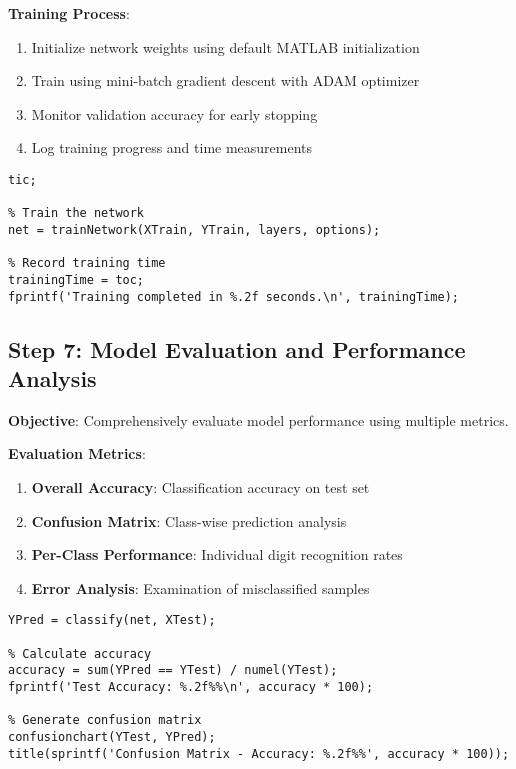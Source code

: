 \documentclass[12pt,a4paper]{article}
\begin{document}
\textbf{Training Process}:
\begin{enumerate}
    \item Initialize network weights using default MATLAB initialization
    \item Train using mini-batch gradient descent with ADAM optimizer
    \item Monitor validation accuracy for early stopping
    \item Log training progress and time measurements
\end{enumerate}

\begin{lstlisting}[caption=Network Training]
% Record training start time
tic;

% Train the network
net = trainNetwork(XTrain, YTrain, layers, options);

% Record training time
trainingTime = toc;
fprintf('Training completed in %.2f seconds.\n', trainingTime);
\end{lstlisting}

\subsection{Step 7: Model Evaluation and Performance Analysis}

\textbf{Objective}: Comprehensively evaluate model performance using multiple metrics.

\textbf{Evaluation Metrics}:
\begin{enumerate}
    \item \textbf{Overall Accuracy}: Classification accuracy on test set
    \item \textbf{Confusion Matrix}: Class-wise prediction analysis
    \item \textbf{Per-Class Performance}: Individual digit recognition rates
    \item \textbf{Error Analysis}: Examination of misclassified samples
\end{enumerate}

\begin{lstlisting}[caption=Model Evaluation]
% Predict on test set
YPred = classify(net, XTest);

% Calculate accuracy
accuracy = sum(YPred == YTest) / numel(YTest);
fprintf('Test Accuracy: %.2f%%\n', accuracy * 100);

% Generate confusion matrix
confusionchart(YTest, YPred);
title(sprintf('Confusion Matrix - Accuracy: %.2f%%', accuracy * 100));
\end{lstlisting}
\end{document}
